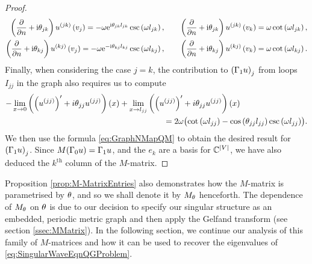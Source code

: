 \begin{proof}
\begin{align*}
		\left( \dfrac{\partial }{\partial n}+\mathrm{i}\theta_{jk} \right)u^{(jk)}\left( v_j \right) = -\omega \mathrm{e}^{\mathrm{i}\theta_{jk}l_{jk}}\csc\left( \omega l_{jk} \right), 
		&\qquad \left( \dfrac{\partial }{\partial n}+\mathrm{i}\theta_{jk} \right)u^{(jk)}\left( v_k \right) = \omega\cot\left( \omega l_{jk} \right), \\
		\left( \dfrac{\partial }{\partial n}+\mathrm{i}\theta_{kj} \right)u^{(kj)}\left( v_j \right) = -\omega \mathrm{e}^{-\mathrm{i}\theta_{kj}l_{kj}}\csc\left( \omega l_{kj} \right), 
		&\qquad \left( \dfrac{\partial }{\partial n}+\mathrm{i}\theta_{kj} \right)u^{(kj)}\left( v_k \right) = \omega\cot\left( \omega l_{kj} \right).
	\end{align*}
	Finally, when considering the case $j=k$, the contribution to $\left( \Gamma_1 u \right)_j$ from loops $I_{jj}$ in the graph also requires us to compute
	\begin{align*}
		-\lim_{x\rightarrow0}\left( \left( u^{(jj)} \right)'+i\theta_{jj}u^{(jj)} \right)(x) + \lim_{x\rightarrow l_{jj}} & \left( \left( u^{(jj)} \right)'+i\theta_{jj}u^{(jj)} \right)(x) \\
		&\qquad = 2\omega\bigl( \cot\left( \omega l_{jj} \right) - \cos\left( \theta_{jj}l_{jj} \right)\csc\left( \omega l_{jj} \right) \bigr).	
	\end{align*}
	We then use the formula \eqref{eq:GraphNMapQM} to obtain the desired result for $\left( \Gamma_1 u \right)_j$.
	Since $M(\Gamma_0 u) = \Gamma_1 u$, and the $e_k$ are a basis for $\mathbb{C}^{\left\lvert V \right\rvert}$, we have also deduced the $k^{\text{th}}$ column of the $M$-matrix.
\end{proof}
Proposition \ref{prop:M-MatrixEntries} also demonstrates how the $M$-matrix is parametrised by $\theta$, and so we shall denote it by $M_{\theta}$ henceforth.
The dependence of $M_\theta$ on $\theta$ is due to our decision to specify our singular structure as an embedded, periodic metric graph and then apply the Gelfand transform (see section \ref{ssec:MMatrix}).
In the following section, we continue our analysis of this family of $M$-matrices and how it can be used to recover the eigenvalues of \eqref{eq:SingularWaveEqnQGProblem}.

